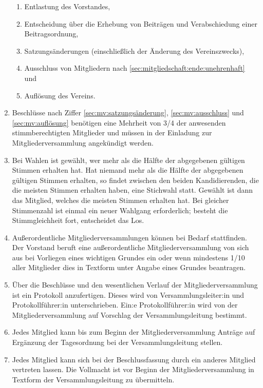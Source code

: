 \documentclass[12pt,paper=a4,ngerman]{scrreprt}
\begin{document}
\begin{enumerate}
\begin{enumerate}
                \item
                    Entlastung des Vorstandes,
                \item
                    Entscheidung über die Erhebung von Beiträgen und Verabschiedung einer Beitragsordnung,
                \item
                    \label{sec:mv:satzungsänderung}
                    Satzungsänderungen (einschließlich der Änderung des Vereinszwecks),
                \item
                    \label{sec:mv:ausschluss}
                    Ausschluss von Mitgliedern nach \ref{sec:mitgliedschaft:ende:unehrenhaft} und
                \item
                    \label{sec:mv:auflösung}
                    Auflösung des Vereins.
            \end{enumerate}
        \item
            Beschlüsse nach Ziffer \ref{sec:mv:satzungsänderung}, \ref{sec:mv:ausschluss} und \ref{sec:mv:auflösung} benötigen eine Mehrheit von 3/4 der anwesenden stimmberechtigten Mitglieder und müssen in der Einladung zur Mitgliederversammlung angekündigt werden.
        \item
            Bei Wahlen ist gewählt, wer mehr als die Hälfte der abgegebenen gültigen Stimmen erhalten hat. Hat niemand mehr als die Hälfte der abgegebenen gültigen Stimmen erhalten, so findet zwischen den beiden Kandidierenden, die die meisten Stimmen erhalten haben, eine Stichwahl statt. Gewählt ist dann das Mitglied, welches die meisten Stimmen erhalten hat. Bei gleicher Stimmenzahl ist einmal ein neuer Wahlgang erforderlich; besteht die Stimmgleichheit fort, entscheidet das Los.
        \item
            Außerordentliche Mitgliederversammlungen können bei Bedarf stattfinden. Der Vorstand beruft eine außerordentliche Mitgliederversammlung von sich aus bei Vorliegen eines wichtigen Grundes ein oder wenn mindestens 1/10 aller Mitglieder dies in Textform unter Angabe eines Grundes beantragen.
        \item
            Über die Beschlüsse und den wesentlichen Verlauf der Mitgliederversammlung ist ein Protokoll anzufertigen. Dieses wird von Versammlungsleiter:in und Protokollführer:in unterschrieben. Ein:e Protokollführer:in wird von der Mitgliederversammlung auf Vorschlag der Versammlungsleitung bestimmt.
        \item
            Jedes Mitglied kann bis zum Beginn der Mitgliederversammlung Anträge auf Ergänzung der Tagesordnung bei der Versammlungsleitung stellen.
        \item
            Jedes Mitglied kann sich bei der Beschlussfassung durch ein anderes Mitglied vertreten lassen. Die Vollmacht ist vor Beginn der Mitgliederversammlung in Textform der Versammlungsleitung zu übermitteln.
	\end{enumerate}
	
\end{document}
